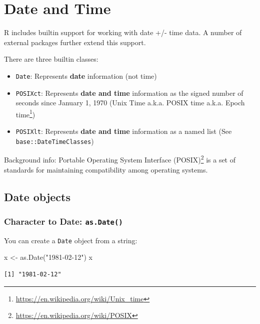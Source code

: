 \documentclass[
]{book}
\newenvironment{Shaded}{\begin{snugshade}}{\end{snugshade}}
\newcommand{\FunctionTok}[1]{\textcolor[rgb]{0.00,0.00,0.00}{#1}}
\newcommand{\NormalTok}[1]{#1}
\newcommand{\OtherTok}[1]{\textcolor[rgb]{0.56,0.35,0.01}{#1}}
\newcommand{\StringTok}[1]{\textcolor[rgb]{0.31,0.60,0.02}{#1}}
\DeclareRobustCommand{\href}[2]{#2\footnote{\url{#1}}}
\providecommand{\tightlist}{%
  \setlength{\itemsep}{0pt}\setlength{\parskip}{0pt}}
\begin{document}
\hypertarget{datetime}{%
\chapter{Date and Time}\label{datetime}}

R includes builtin support for working with date +/- time data. A number of external packages further extend this support.

There are three builtin classes:

\begin{itemize}
\tightlist
\item
  \texttt{Date}: Represents \textbf{date} information (not time)
\item
  \texttt{POSIXct}: Represents \textbf{date and time} information as the signed number of seconds since January 1, 1970 (\href{https://en.wikipedia.org/wiki/Unix_time}{Unix Time a.k.a. POSIX time a.k.a. Epoch time})
\item
  \texttt{POSIXlt}: Represents \textbf{date and time} information as a named list (See \texttt{base::DateTimeClasses})
\end{itemize}

Background info: \href{https://en.wikipedia.org/wiki/POSIX}{Portable Operating System Interface (POSIX)} is a set of standards for maintaining compatibility among operating systems.

\hypertarget{date-objects}{%
\section{Date objects}\label{date-objects}}

\hypertarget{character-to-date-as.date}{%
\subsection{\texorpdfstring{Character to Date: \texttt{as.Date()}}{Character to Date: as.Date()}}\label{character-to-date-as.date}}

You can create a \texttt{Date} object from a string:

\begin{Shaded}
\begin{Highlighting}[]
\NormalTok{x }\OtherTok{\textless{}{-}} \FunctionTok{as.Date}\NormalTok{(}\StringTok{"1981{-}02{-}12"}\NormalTok{)}
\NormalTok{x}
\end{Highlighting}
\end{Shaded}

\begin{verbatim}
[1] "1981-02-12"
\end{verbatim}
\end{document}
